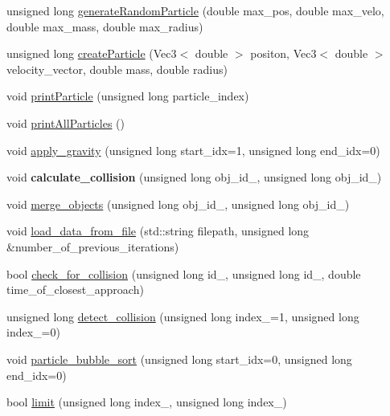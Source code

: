 \begin{DoxyCompactItemize}
\item 
unsigned long \hyperlink{classParticle_aa08eae09137e5ecb9440ad956c2b4ed7}{generate\+Random\+Particle} (double max\+\_\+pos, double max\+\_\+velo, double max\+\_\+mass, double max\+\_\+radius)
\item 
unsigned long \hyperlink{classParticle_ad13916c98c9d37de12420205299f1e2a}{create\+Particle} (Vec3$<$ double $>$ positon, Vec3$<$ double $>$ velocity\+\_\+vector, double mass, double radius)
\item 
void \hyperlink{classParticle_ac68f9be7c033bc006fac8b90b31fad6b}{print\+Particle} (unsigned long particle\+\_\+index)
\item 
void \hyperlink{classParticle_a9acb129d789df24580508e20816f2922}{print\+All\+Particles} ()
\item 
void \hyperlink{classParticle_a9eebf91161c113031c3f0816134edb9f}{apply\+\_\+gravity} (unsigned long start\+\_\+idx=1, unsigned long end\+\_\+idx=0)
\item 
\hypertarget{classParticle_afeafa33cfa8f5f921c8e2dbe1a05619b}{}void {\bfseries calculate\+\_\+collision} (unsigned long obj\+\_\+id\+\_, unsigned long obj\+\_\+id\+\_)\label{classParticle_afeafa33cfa8f5f921c8e2dbe1a05619b}

\item 
void \hyperlink{classParticle_a735866943458453aa5e7b9936497ca0a}{merge\+\_\+objects} (unsigned long obj\+\_\+id\+\_, unsigned long obj\+\_\+id\+\_)
\item 
void \hyperlink{classParticle_a1debf31d79f42067ec29523c8ac330fe}{load\+\_\+data\+\_\+from\+\_\+file} (std\+::string filepath, unsigned long \&number\+\_\+of\+\_\+previous\+\_\+iterations)
\item 
bool \hyperlink{classParticle_a70dfb979ff9b1af7cd4b984b3f88f4ea}{check\+\_\+for\+\_\+collision} (unsigned long id\+\_, unsigned long id\+\_, double time\+\_\+of\+\_\+closest\+\_\+approach)
\item 
unsigned long \hyperlink{classParticle_a3bcbd18f7b6f23282c64b6b91ca0404e}{detect\+\_\+collision} (unsigned long index\+\_=1, unsigned long index\+\_=0)
\item 
void \hyperlink{classParticle_ab46533030ac2e5a8df69f2cfe862e29c}{particle\+\_\+bubble\+\_\+sort} (unsigned long start\+\_\+idx=0, unsigned long end\+\_\+idx=0)
\item 
bool \hyperlink{classParticle_aed2328ab3e7f1b839b2d73834557d6ce}{limit} (unsigned long index\+\_, unsigned long index\+\_)
\end{DoxyCompactItemize}


